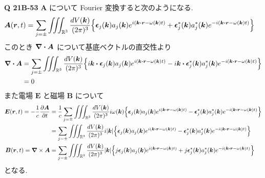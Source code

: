 \documentclass[uplatex,dvipdfmx,a4paper,11pt]{jlreq}
\newcommand{\RR}{\mathbb{R}}
\newcommand{\EE}{\bm{E}}
\newcommand{\BB}{\bm{B}}
\renewcommand{\AA}{\bm{A}}
\newcommand{\rr}{\bm{r}}
\newcommand{\kk}{\bm{k}}
\theoremstyle{definition}
\begin{document}
\textbf{Q 21B-53}
$\AA$ について Fourier 変換すると次のようになる.
\begin{align}
  \AA(\rr, t) & = \sum_{j=\pm}\iiint_{\RR^3}\frac{dV(\kk)}{(2\pi)^3}\qty{\ee_j(\kk)a_j(\kk)e^{\ii(\kk\vdot\rr - \omega(\kk)t)} + \ee_j^*(\kk)a_j^*(\kk)e^{-\ii(\kk\vdot\rr - \omega(\kk)t)}}
\end{align}
このとき $\vnabla\vdot\AA$ について基底ベクトルの直交性より
\begin{align}
  \vnabla\vdot\AA & = \sum_{j=\pm}\iiint_{\RR^3}\frac{dV(\kk)}{(2\pi)^3}\qty{\ii\kk\vdot\ee_j(\kk)a_j(\kk)e^{\ii(\kk\vdot\rr - \omega(\kk)t)} - \ii\kk\vdot\ee_j^*(\kk)a_j^*(\kk)e^{-\ii(\kk\vdot\rr - \omega(\kk)t)}} \\
                  & = 0
\end{align}
また電場 $\EE$ と磁場 $\BB$ について
\begin{align}
  \EE(\rr, t) = -\frac{1}{c}\pdv{\AA}{t} & = \frac{1}{c}\sum_{j=\pm}\iiint_{\RR^3}\frac{dV(\kk)}{(2\pi)^3}\ii\omega(\kk)\qty{\ee_j(\kk)a_j(\kk)e^{\ii(\kk\vdot\rr - \omega(\kk)t)} - \ee_j^*(\kk)a_j^*(\kk)e^{-\ii(\kk\vdot\rr - \omega(\kk)t)}} \\
                                         & = \sum_{j=\pm}\iiint_{\RR^3}\frac{dV(\kk)}{(2\pi)^3}\ii|\kk|\qty{\ee_j(\kk)a_j(\kk)e^{\ii(\kk\vdot\rr - \omega(\kk)t)} - \ee_j^*(\kk)a_j^*(\kk)e^{-\ii(\kk\vdot\rr - \omega(\kk)t)}}                  \\
  \BB(\rr, t) = \vnabla\times\AA         & = \sum_{j=\pm}\iiint_{\RR^3}\frac{dV(\kk)}{(2\pi)^3}|\kk|\qty{j\ee_j(\kk)a_j(\kk)e^{\ii(\kk\vdot\rr - \omega(\kk)t)} + j\ee_j^*(\kk)a_j^*(\kk)e^{-\ii(\kk\vdot\rr - \omega(\kk)t)}}
\end{align}
となる. \\
\end{document}
